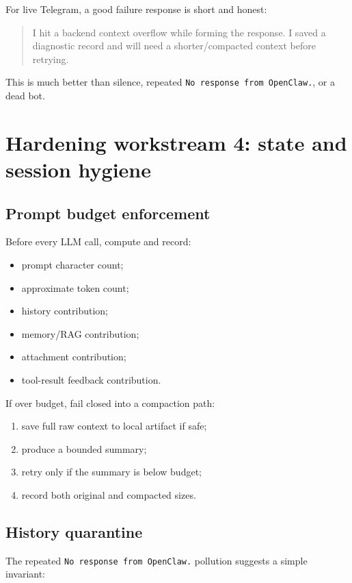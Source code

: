 \documentclass[11pt]{article}
\begin{document}
For live Telegram, a good failure response is short and honest:

\begin{quote}
I hit a backend context overflow while forming the response. I saved a diagnostic record and will need a shorter/compacted context before retrying.
\end{quote}

This is much better than silence, repeated \texttt{No response from OpenClaw.}, or a dead bot.

\section{Hardening workstream 4: state and session hygiene}

\subsection{Prompt budget enforcement}

Before every LLM call, compute and record:

\begin{itemize}
  \item prompt character count;
  \item approximate token count;
  \item history contribution;
  \item memory/RAG contribution;
  \item attachment contribution;
  \item tool-result feedback contribution.
\end{itemize}

If over budget, fail closed into a compaction path:

\begin{enumerate}
  \item save full raw context to local artifact if safe;
  \item produce a bounded summary;
  \item retry only if the summary is below budget;
  \item record both original and compacted sizes.
\end{enumerate}

\subsection{History quarantine}

The repeated \texttt{No response from OpenClaw.} pollution suggests a simple invariant:
\end{document}
